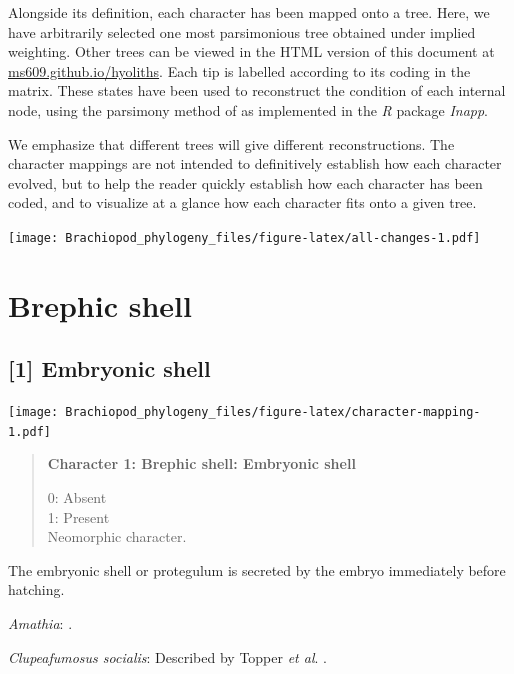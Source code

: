 \documentclass[openany]{book}
\begin{document}
Alongside its definition, each character has been mapped onto a tree.
Here, we have arbitrarily selected one most parsimonious tree obtained
under implied weighting. Other trees can be viewed in the HTML version
of this document at
\href{https://ms609.github.io/hyoliths/reconstructions.html}{ms609.github.io/hyoliths}.
Each tip is labelled according to its coding in the matrix. These states
have been used to reconstruct the condition of each internal node, using
the parsimony method of \citet{Brazeau2018} as implemented in the
\emph{R} package \emph{Inapp}.

We emphasize that different trees will give different reconstructions.
The character mappings are not intended to definitively establish how
each character evolved, but to help the reader quickly establish how
each character has been coded, and to visualize at a glance how each
character fits onto a given tree.







\texttt{[image: Brachiopod\_phylogeny\_files/figure-latex/all-changes-1.pdf]}

\section{Brephic shell}\label{brephic-shell}

\subsection*{{[}1{]} Embryonic shell}\label{embryonic-shell}

\texttt{[image: Brachiopod\_phylogeny\_files/figure-latex/character-mapping-1.pdf]}

\begin{quote}
\textbf{Character 1: Brephic shell: Embryonic shell}

0: Absent\\
1: Present\\
Neomorphic character.
\end{quote}

The embryonic shell or protegulum is secreted by the embryo immediately
before hatching.

\hypertarget{Amathia-coding-1}{}
\emph{Amathia}: \citet{Reed1982}.

\hypertarget{Clupeafumosus_socialis-coding-1}{}
\emph{Clupeafumosus socialis}: Described by Topper \emph{et al}.
\citeyearpar{Topper2013Reappraisalof}.
\end{document}
